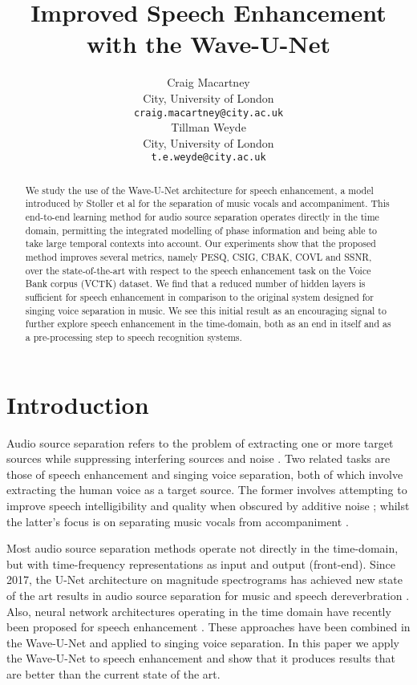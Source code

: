 \documentclass{article}
\title{Improved Speech Enhancement with the Wave-U-Net}
\author{
  Craig Macartney \\
City, University of London\\
  \texttt{craig.macartney@city.ac.uk} \\
  \And
  Tillman Weyde \\
  City, University of London \\
  \texttt{t.e.weyde@city.ac.uk} 
}
\begin{document}
\maketitle

\begin{abstract}
We study the use of the Wave-U-Net architecture for speech enhancement, a model introduced by Stoller et al for the separation of music vocals and accompaniment. 
 This end-to-end learning method for audio source separation 
 operates directly in the time domain, permitting the integrated modelling of phase information 
 and being able to take large temporal contexts into account. 
 Our experiments show that the proposed method improves several metrics, namely PESQ, CSIG, CBAK, COVL and SSNR, 
 over 
 the 
 state-of-the-art with respect to the speech enhancement task on the Voice Bank corpus (VCTK) dataset. 
 We find that a reduced number of hidden layers is sufficient for speech enhancement in comparison to the original system designed for singing voice separation in music.  
 We see this initial result as an encouraging signal to further explore speech enhancement in the time-domain, both as an end in itself and as a pre-processing step to speech recognition systems. 
\end{abstract}

\section{Introduction}

Audio source separation refers to the problem of extracting one or more target sources while suppressing interfering sources and noise \citep{2018AudioEnhancement}. 
Two related tasks 
are those of speech enhancement and singing voice separation, both of which involve extracting the human voice as a target source. 
The former involves attempting to improve  speech intelligibility and quality when obscured by additive noise \citep{Loizou:2013:SET:2484638, Pascual2017, 2018AudioEnhancement}; whilst the latter's focus is on separating music vocals from accompaniment \citep{Stoller2018Wave-U-Net:Separation}.

Most audio source separation methods operate not directly in the time-domain, but with 
time-frequency representations as input and output (front-end).
Since 2017, the U-Net architecture on magnitude spectrograms has achieved new state of the art results in audio source separation for music \citep{Jansson-et-al-2017-Sining} and speech dereverbration \citep{Ori-et-al-2018-Speech-Dereverbration}. 
Also, neural network architectures operating in the time domain have recently been proposed for speech enhancement \citep{Pascual2017, RethageADenoising}.
These approaches have been combined in the Wave-U-Net
\citep{Stoller2018Wave-U-Net:Separation} and applied to singing voice separation. 
In this paper we apply the Wave-U-Net to speech enhancement and show that it produces results that are better than the current state of the art. 
\end{document}
